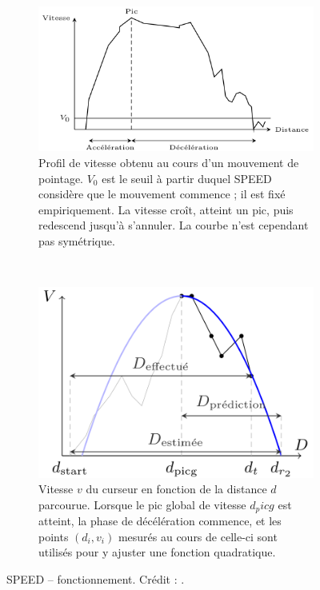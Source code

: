 	\begin{figure}[!htb]
		\begin{subfigure}[t]{0.49\textwidth}
			\centering
			\includegraphics[width=\textwidth]{figures/ch2/speedProfile}
			\caption{Profil de vitesse obtenu au cours d'un mouvement de pointage. $V_{0}$ est le seuil à partir duquel SPEED considère que le mouvement commence ; il est fixé empiriquement. La vitesse croît, atteint un pic, puis redescend jusqu'à s'annuler. La courbe n'est cependant pas symétrique.}
			\label{fig:speedProfile}
		\end{subfigure}
		~
		\begin{subfigure}[t]{0.49\textwidth}
			\centering
			\includegraphics[width=\textwidth]{figures/ch2/speedExplained}
			\caption{Vitesse $v$ du curseur en fonction de la distance $d$ parcourue. Lorsque le pic global de vitesse $d_picg$ est atteint, la phase de décélération commence, et les points $(d_{i}, v_{i})$ mesurés au cours de celle-ci sont utilisés pour y ajuster une fonction quadratique.}
			\label{fig:speedExplained}
		\end{subfigure}
		\caption[SPEED -- fonctionnement]{SPEED -- fonctionnement. Crédit : \cite{wonner2011speed}.}
		\label{fig:speedCursor}
	\end{figure}
	
